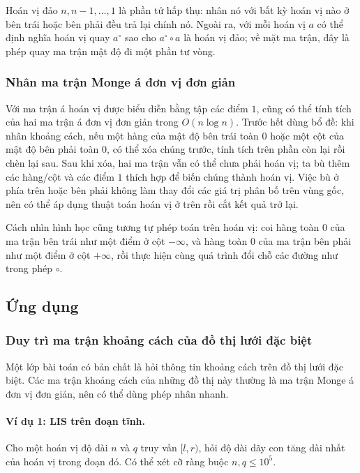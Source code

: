\documentclass[11pt]{article}
\begin{document}
Hoán vị đảo $n,n-1,\ldots,1$ là phần tử hấp thụ: nhân nó với bất kỳ hoán vị nào
ở bên trái hoặc bên phải đều trả lại chính nó. Ngoài ra, với mỗi hoán vị $a$
có thể định nghĩa hoán vị quay $a^\circ$ sao cho $a^\circ\circ a$ là hoán vị
đảo; về mặt ma trận, đây là phép quay ma trận mật độ đi một phần tư vòng.

\subsubsection{Nhân ma trận Monge á đơn vị đơn giản}

Với ma trận á hoán vị được biểu diễn bằng tập các điểm $1$, cũng có thể tính
tích của hai ma trận á đơn vị đơn giản trong $O(n\log n)$. Trước hết dùng bổ
đề: khi nhân khoảng cách, nếu một hàng của mật độ bên trái toàn $0$ hoặc một
cột của mật độ bên phải toàn $0$, có thể xóa chúng trước, tính tích trên phần
còn lại rồi chèn lại sau. Sau khi xóa, hai ma trận vẫn có thể chưa phải hoán
vị; ta bù thêm các hàng/cột và các điểm $1$ thích hợp để biến chúng thành hoán
vị. Việc bù ở phía trên hoặc bên phải không làm thay đổi các giá trị phân bố
trên vùng gốc, nên có thể áp dụng thuật toán hoán vị ở trên rồi cắt kết quả
trở lại.

Cách nhìn hình học cũng tương tự phép toán trên hoán vị: coi hàng toàn $0$ của
ma trận bên trái như một điểm ở cột $-\infty$, và hàng toàn $0$ của ma trận bên
phải như một điểm ở cột $+\infty$, rồi thực hiện cùng quá trình đổi chỗ các
đường như trong phép $\circ$.

\subsection{Ứng dụng}

\subsubsection{Duy trì ma trận khoảng cách của đồ thị lưới đặc biệt}

Một lớp bài toán có bản chất là hỏi thông tin khoảng cách trên đồ thị lưới đặc
biệt. Các ma trận khoảng cách của những đồ thị này thường là ma trận Monge á
đơn vị đơn giản, nên có thể dùng phép nhân nhanh.

\paragraph{Ví dụ 1: LIS trên đoạn tĩnh.}
Cho một hoán vị độ dài $n$ và $q$ truy vấn $[l,r)$, hỏi độ dài dãy con tăng dài
nhất của hoán vị trong đoạn đó. Có thể xét cỡ ràng buộc $n,q\le 10^5$.
\end{document}
